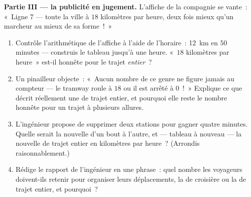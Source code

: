 \begin{problem}
\medskip\noindent\textbf{Partie III --- la publicité en jugement.}
L'affiche de la compagnie se vante~: «~Ligne 7 --- toute la ville à
$18$ kilomètres par heure, deux fois mieux qu'un marcheur au
mieux de sa forme~!~»
\begin{enumerate}[resume]
  \item Contrôle l'arithmétique de l'affiche à l'aide de l'horaire~:
        \qty{12}{km} en $50$ minutes --- construis le tableau
        jusqu'à une heure. «~$18$ kilomètres par heure~»
        est-il honnête pour le trajet \emph{entier}~?
  \item Un pinailleur objecte~: «~Aucun nombre de ce genre ne figure
        jamais au compteur --- le tramway roule à $18$ ou il est
        arrêté à $0$~!~» Explique ce que décrit réellement une
         de trajet entier, et pourquoi elle reste le nombre
        honnête pour un trajet à plusieurs allures.
  \item L'ingénieur propose de supprimer deux stations pour gagner
        quatre minutes. Quelle serait la nouvelle  d'un bout à
        l'autre, et --- tableau à nouveau --- la nouvelle  de
        trajet entier en kilomètres par heure~? (Arrondis
        raisonnablement.)
  \item Rédige le rapport de l'ingénieur en une phrase~: quel nombre
        les voyageurs doivent-ils retenir pour organiser leurs
        déplacements, la  de croisière ou la  de
        trajet entier, et pourquoi~?
\end{enumerate}
\end{problem}
